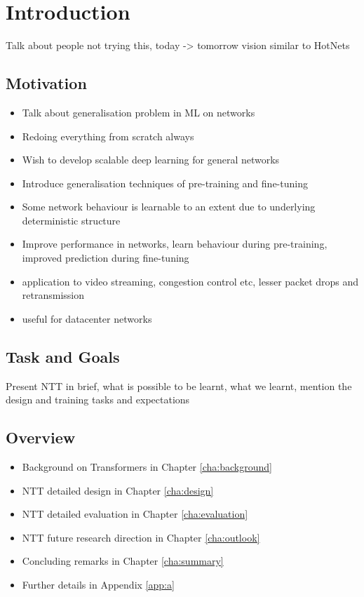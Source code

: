 \chapter{Introduction}
\label{cha:introduction}

Talk about people not trying this, today -> tomorrow vision similar to HotNets

\section{Motivation}
\label{sec:motivation}

\begin{itemize}
\item Talk about generalisation problem in ML on networks
\item Redoing everything from scratch always
\item Wish to develop scalable deep learning for general networks
\item Introduce generalisation techniques of pre-training and fine-tuning

\item Some network behaviour is learnable to an extent due to underlying deterministic structure 
\item Improve performance in networks, learn behaviour during pre-training, improved prediction during fine-tuning
\item application to video streaming, congestion control etc, lesser packet drops and retransmission 
\item useful for datacenter networks
\end{itemize}

\section{Task and Goals}
\label{sec:task}

Present NTT in brief, what is possible to be learnt, what we learnt, mention the design and training tasks and expectations 

\section{Overview}
\label{sec:overview}

\begin{itemize}
\item Background on Transformers in Chapter \ref{cha:background}
\item NTT detailed design in Chapter \ref{cha:design}
\item NTT detailed evaluation in Chapter \ref{cha:evaluation}
\item NTT future research direction in Chapter \ref{cha:outlook}
\item Concluding remarks in Chapter \ref{cha:summary}
\item Further details in  Appendix \ref{app:a}


\end{itemize}